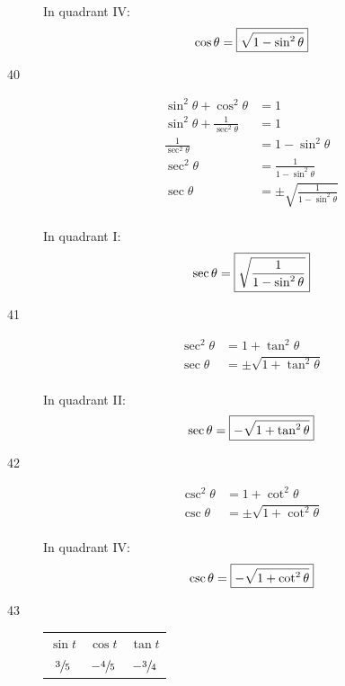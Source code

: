 \documentclass{exam}
\begin{document}
\begin{description}
        In quadrant IV:
        \[
          \cos \theta = \boxed{ \sqrt{ 1 - \sin^2 \theta } } \\
        \]

      \item[40]
        \begin{align*}
          \sin^2 \theta + \cos^2 \theta           & = 1 \\
          \sin^2 \theta + \frac{1}{\sec^2 \theta} & = 1 \\
          \frac{1}{\sec^2 \theta}                 & = 1 - \sin^2 \theta \\
          \sec^2 \theta                           & = \frac{1}{1 - \sin^2 \theta} \\
          \sec \theta                             & = \pm \sqrt{ \frac{1}{1 - \sin^2 \theta} } \\
        \end{align*}

        In quadrant I:
        \[
          \sec \theta = \boxed{ \sqrt{ \frac{1}{1 - \sin^2 \theta} } } \\
        \]

      \item[41]
        \begin{align*}
          \sec^2 \theta & = 1 + \tan^2 \theta \\
          \sec \theta   & = \pm \sqrt{ 1 + \tan^2 \theta } \\
        \end{align*}

        In quadrant II:
        \[
          \sec \theta = \boxed{ - \sqrt{ 1 + \tan^2 \theta } } \\
        \]

      \item[42]
        \begin{align*}
          \csc^2 \theta & = 1 + \cot^2 \theta \\
          \csc \theta   & = \pm \sqrt{ 1 + \cot^2 \theta } \\
        \end{align*}

        In quadrant IV:
        \[
          \csc \theta = \boxed{ - \sqrt{ 1 + \cot^2 \theta } } \\
        \]

      \item[43]
        \begin{tabular}[H]{ccc}
          \toprule

          $\sin t$       & $\cos t$         & $\tan t$        \\
          $\sfrac{3}{5}$ & $- \sfrac{4}{5}$ & $- \sfrac{3}{4}$ \\


\end{tabular}
\end{description}
\end{document}

